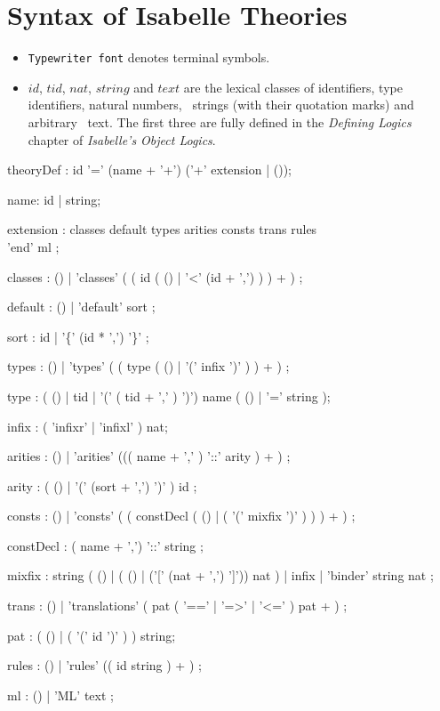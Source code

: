 
\appendix
{}  %

\chapter{Syntax of Isabelle Theories}\label{app:TheorySyntax}
\begin{itemize}
\item {\tt Typewriter font} denotes terminal symbols.
\item $id$, $tid$, $nat$, $string$ and $text$ are the lexical classes of
  identifiers, type identifiers, natural numbers, \ML\ strings (with their
  quotation marks) and arbitrary \ML\ text.  The first three are fully defined
  in the {\it Defining Logics} chapter of {\it Isabelle's Object Logics}.
\end{itemize}

\begin{rail}

theoryDef : id '=' (name + '+') ('+' extension | ());

name: id | string;

extension : classes default types arities consts trans rules \\ 'end' ml
          ;

classes : ()
        | 'classes' ( ( id (  ()
                            | '<' (id + ',')
                           ) 
                       ) + )
        ;

default : ()
        | 'default' sort 
        ;

sort :  id
     | '\{' (id * ',') '\}'
     ;

types :  ()
      | 'types' ( ( type ( () | '(' infix ')' ) ) + )
      ;

type : ( () | tid | '(' ( tid + ',' ) ')') name ( () | '='  string );

infix : ( 'infixr' | 'infixl' ) nat;


arities :  ()
        | 'arities' ((( name + ',' ) '::' arity ) + )
        ;

arity   : ( () 
          | '(' (sort + ',') ')' 
          ) id
        ;


consts :  ()
       | 'consts' ( ( constDecl ( () | ( '(' mixfix ')' ) ) ) + )
       ;

constDecl : ( name + ',') '::' string ;


mixfix :  string ( () | ( () | ('[' (nat + ',') ']')) nat )
       | infix
       | 'binder' string nat ;

trans : ()
      | 'translations' ( pat ( '==' | '=>' | '<=' ) pat + )
      ;

pat : ( () | ( '(' id ')' ) ) string;

rules :  ()
      | 'rules' (( id string ) + )
      ;

ml :  ()
   | 'ML' text
   ;

\end{rail}

